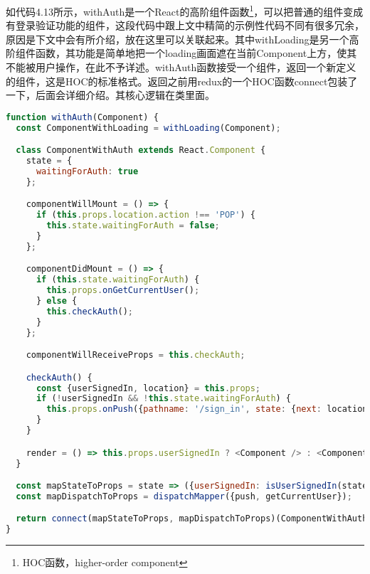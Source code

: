 如代码4.13所示，withAuth是一个React的高阶组件函数\footnote{HOC函数，higher-order component}，可以把普通的组件变成有登录验证功能的组件，这段代码中跟上文中精简的示例性代码不同有很多冗余，原因是下文中会有所介绍，放在这里可以关联起来。其中withLoading是另一个高阶组件函数，其功能是简单地把一个loading画面遮在当前Component上方，使其不能被用户操作，在此不予详述。withAuth函数接受一个组件，返回一个新定义的组件，这是HOC的标准格式。返回之前用redux的一个HOC函数connect包装了一下，后面会详细介绍。其核心逻辑在类里面。

\begin{lstlisting}[language={JavaScript}, caption={withAuth高阶组件函数}]
function withAuth(Component) {
  const ComponentWithLoading = withLoading(Component);

  class ComponentWithAuth extends React.Component {
    state = {
      waitingForAuth: true
    };

    componentWillMount = () => {
      if (this.props.location.action !== 'POP') {
        this.state.waitingForAuth = false;
      }
    };

    componentDidMount = () => {
      if (this.state.waitingForAuth) {
        this.props.onGetCurrentUser();
      } else {
        this.checkAuth();
      }
    };

    componentWillReceiveProps = this.checkAuth;

    checkAuth() {
      const {userSignedIn, location} = this.props;
      if (!userSignedIn && !this.state.waitingForAuth) {
        this.props.onPush({pathname: '/sign_in', state: {next: location}});
      }
    }

    render = () => this.props.userSignedIn ? <Component /> : <ComponentWithLoading />;
  }

  const mapStateToProps = state => ({userSignedIn: isUserSignedIn(state)});
  const mapDispatchToProps = dispatchMapper({push, getCurrentUser});

  return connect(mapStateToProps, mapDispatchToProps)(ComponentWithAuth);
}
\end{lstlisting}

